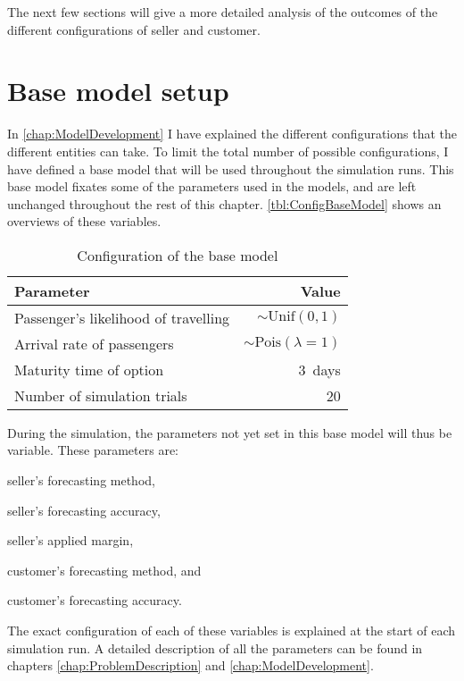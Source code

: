The next few sections will give a more detailed analysis of the outcomes of the different configurations of seller and customer.



\section{Base model setup}
In \autoref{chap:ModelDevelopment} I have explained the different configurations that the different entities can take. To limit the total number of possible configurations, I have defined a base model that will be used throughout the simulation runs. This base model fixates some of the parameters used in the models, and are left unchanged throughout the rest of this chapter. \autoref{tbl:ConfigBaseModel} shows an overviews of these variables.

 \begin{table} \centering
    \begin{tabular}{l  r}
    \toprule
    Parameter      &  Value \\
    \midrule
    Passenger's likelihood of travelling  &  $\sim \mbox{Unif}(0, 1)$  \\
    Arrival rate of passengers   &  $\sim \mbox{Pois}(\lambda=1)$ \\
    Maturity time of option      &  3~days \\
    Number of simulation trials  &  20 \\
    \bottomrule
    \end{tabular}
    \caption{Configuration of the base model}
    \label{tbl:ConfigBaseModel}
\end{table}
During the simulation, the parameters not yet set in this base model will thus be variable. These parameters are:


\begin{compactitem}
    \item seller's forecasting method,
    \item seller's forecasting accuracy,
    \item seller's applied margin,
    \item customer's forecasting method, and
    \item customer's forecasting accuracy.
\end{compactitem}

The exact configuration of each of these variables is explained at the start of each simulation run. A detailed description of all the parameters can be found in chapters \ref{chap:ProblemDescription} and \ref{chap:ModelDevelopment}.



